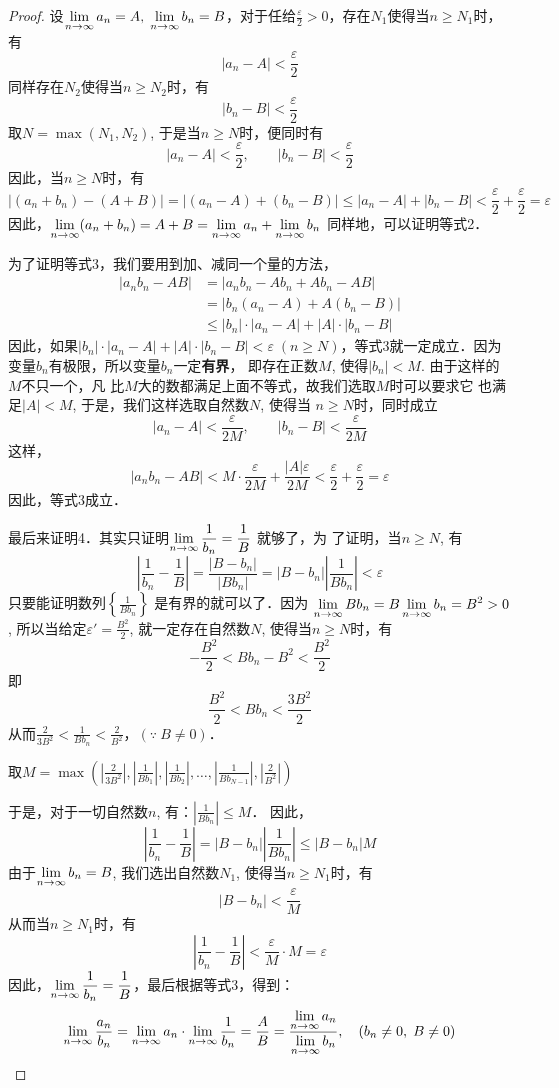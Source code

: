 \begin{proof}
    设$\displaystyle\lim_{n\to\infty}a_n=A,\; \displaystyle\lim_{n\to\infty}b_n=B$，对于任给$\frac{\varepsilon}{2}>0$，存在$N_1$使得当$n\ge N_1$时，有
\[|a_n-A|<\frac{\varepsilon}{2}\]
    同样存在$N_2$使得当$n\ge N_2$时，有
    \[|b_n-B|<\frac{\varepsilon}{2}\]
    取$N=\max(N_1,N_2)$, 于是当$n\ge N$时，便同时有
\[|a_n-A|<\frac{\varepsilon}{2},\qquad |b_n-B|<\frac{\varepsilon}{2}\]
    因此，当$n\ge N$时，有
\[|(a_n+b_n)-(A+B)|=|(a_n-A)+(b_n-B)|\le |a_n-A|+|b_n-B|<\frac{\varepsilon}{2}+\frac{\varepsilon}{2}=\varepsilon\]
因此，$\displaystyle\lim_{n\to\infty}(a_n+b_n)=A+B=\displaystyle\lim_{n\to\infty}a_n+\displaystyle\lim_{n\to\infty}b_n$
同样地，可以证明等式2．

为了证明等式3，我们要用到加、减同一个量的方法，
\[\begin{split}
    |a_nb_n - AB| &= |a_nb_n - Ab_n + Ab_n -AB|\\
&=|b_n(a_n-A)+A(b_n-B)|\\
&\le |b_n|\cdot |a_n-A|+|A|\cdot |b_n-B|
\end{split}\]
因此，如果$|b_n|\cdot |a_n-A|+|A|\cdot |b_n-B|<\varepsilon\; (n\ge N)$，等式3就一定成立．因为变量$b_n$有极限，所以变量$b_n$一定\textbf{有界}，
即存在正数$M$, 使得$|b_n|<M$. 由于这样的$M$不只一个，凡
比$M$大的数都满足上面不等式，故我们选取$M$时可以要求它
也满足$|A|<M$, 于是，我们这样选取自然数$N$, 使得当
$n\ge N$时，同时成立
\[|a_n-A|<\frac{\varepsilon}{2M},\qquad |b_n-B|<\frac{\varepsilon}{2M}\]
这样，
\[|a_nb_n-AB|<M\cdot \frac{\varepsilon}{2M}+\frac{|A|\varepsilon}{2M}<\frac{\varepsilon}{2}+\frac{\varepsilon}{2}=\varepsilon\]
因此，等式3成立．

最后来证明4．其实只证明$\displaystyle\lim_{n\to\infty}\dfrac{1}{b_n}=\dfrac{1}{B}$
就够了，为
了证明，当$n\ge N$, 有
\[\left|\frac{1}{b_n}-\frac{1}{B}\right|=\frac{|B-b_n|}{|Bb_n|}=|B-b_n|\left|\frac{1}{Bb_n}\right|<\varepsilon\]
只要能证明数列$\left\{\frac{1}{Bb_n}\right\}$
是有界的就可以了．因为
$\displaystyle\lim_{n\to\infty}Bb_n=B\displaystyle\lim_{n\to\infty}b_n=B^2>0$, 所以当给定$\varepsilon'=\frac{B^2}{2}$, 
就一定存在自然数$N$, 使得当$n\ge N$时，有
\[-\frac{B^2}{2}<Bb_n-B^2<\frac{B^2}{2}\]
即
\[\frac{B^2}{2}<Bb_n<\frac{3B^2}{2}\]
从而$\frac{2}{3B^2}<\frac{1}{Bb_n}<\frac{2}{B^2}$，$(\because\ B\ne 0)$．

取$M=\max\left(\left|\frac{2}{3B^2}\right|, \left|\frac{1}{Bb_1}\right|, \left|\frac{1}{Bb_2}\right|, \ldots, \left|\frac{1}{Bb_{N-1}}\right|,\left|\frac{2}{B^2}\right|\right)$

于是，对于一切自然数$n$, 有：$\left|\frac{1}{Bb_n}\right|\le M$．
因此，
\[\left|\frac{1}{b_n}-\frac{1}{B}\right|=|B-b_n|\left|\frac{1}{Bb_n}\right|\le |B-b_n|M\]
由于$\displaystyle\lim_{n\to\infty}b_n=B$, 我们选出自然数$N_1$, 使得当$n\ge N_1$时，有
\[|B-b_n|<\frac{\varepsilon}{M}\]
从而当$n\ge N_1$时，有
\[\left|\frac{1}{b_n}-\frac{1}{B}\right|<\frac{\varepsilon}{M}\cdot M=\varepsilon\]
因此，$\displaystyle\lim_{n\to\infty}\dfrac{1}{b_n}=\dfrac{1}{B}$，最后根据等式3，得到：
\[\displaystyle\lim_{n\to\infty}\dfrac{a_n}{b_n}=\displaystyle\lim_{n\to\infty}a_n\cdot \displaystyle\lim_{n\to\infty}\dfrac{1}{b_n}=\dfrac{A}{B}=\dfrac{\displaystyle\lim_{n\to\infty}a_n}{\displaystyle\lim_{n\to\infty}b_n},\quad (b_n\ne 0,\; B\ne 0)\]
\end{proof}


